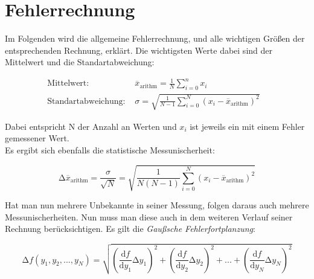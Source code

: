 \section{Fehlerrechnung}
\label{sec:Fehlerrechnung}


Im Folgenden wird die allgemeine Fehlerrechnung, und alle wichtigen Größen der entsprechenden Rechnung, erklärt.
Die wichtigsten Werte dabei sind der Mittelwert und die Standartabweichung:

\begin{align}
    \text{Mittelwert:} & \stackrel{_{-}}{x}_{\text{arithm}}  = \frac{1}{N} \sum_{i=0}^{n} x_i & \\
    \text{Standartabweichung: } & \sigma  = \sqrt{\frac{1}{N - 1 } \sum_{i=0}^{N} (x_i -  \stackrel{_{-}}{x}_{\text{arithm}})^2}
\end{align}

Dabei entspricht N der Anzahl an Werten und $x_i$ ist jeweils ein mit einem Fehler gemessener Wert.\\
Es ergibt sich ebenfalls die statistische Messunischerheit:

\begin{equation}
    \increment \stackrel{_{-}}{x}_{\text{arithm}} = \frac{\sigma}{\sqrt{N}} = 
    \sqrt{\frac{1}{N(N - 1)} \sum_{i=0}^{N} (x_i -  \stackrel{_{-}}{x}_{\text{arithm}})^2}
\end{equation}

Hat man nun mehrere Unbekannte in seiner Messung, folgen daraus auch mehrere Messunischerheiten.
Nun muss man diese auch in dem weiteren Verlauf seiner Rechnung berücksichtigen.
Es gilt die \textit{Gaußsche Fehlerfortplanzung}:

\begin{equation} \label{fehler:gauß}
    \increment f(y_1 ,y_2 ,...,y_N ) = \sqrt{\left(\frac{\text{d} f}{\text{d} y_{1}} \increment y_{1}\right)^2
    + \left(\frac{\text{d} f}{\text{d} y_{2}} \increment y_{2}\right)^2 + ... + 
    \left(\frac{\text{d} f}{\text{d} y_{N}} \increment y_{N}\right)^2
    }
\end{equation}